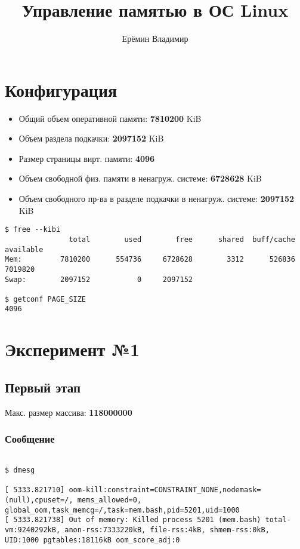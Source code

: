 \documentclass[12pt,a4paper]{article}
\title{Управление памятью в ОС Linux}
\author{Ерёмин Владимир}
\begin{document}
\maketitle

\section{Конфигурация}
\begin{itemize}
\item Общий объем оперативной памяти: \textbf{7810200}  KiB
\item Объем раздела подкачки: \textbf{2097152} KiB
\item Размер страницы вирт. памяти: \textbf{4096}
\item Объем свободной физ. памяти в ненагруж. системе: \textbf{6728628} KiB
\item Объем свободного пр-ва в разделе подкачки в ненагруж. системе: \textbf{2097152} KiB
\end{itemize}

\begin{verbatim}
$ free --kibi
               total        used        free      shared  buff/cache   available
Mem:         7810200      554736     6728628        3312      526836     7019820
Swap:        2097152           0     2097152

$ getconf PAGE_SIZE
4096
\end{verbatim}

\section{Эксперимент №1}

\subsection{Первый этап}

Макс. размер массива: \textbf{118000000}

\subsubsection{Сообщение}

\begin{verbatim}

$ dmesg

[ 5333.821710] oom-kill:constraint=CONSTRAINT_NONE,nodemask=(null),cpuset=/, mems_allowed=0, global_oom,task_memcg=/,task=mem.bash,pid=5201,uid=1000
[ 5333.821738] Out of memory: Killed process 5201 (mem.bash) total-vm:9240292kB, anon-rss:7333220kB, file-rss:4kB, shmem-rss:0kB, UID:1000 pgtables:18116kB oom_score_adj:0
\end{verbatim}
\end{document}
